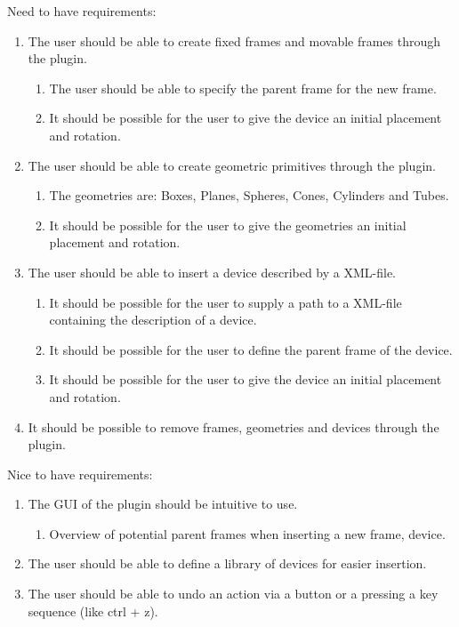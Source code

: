Need to have requirements:
\begin{enumerate}
	\item The user should be able to create fixed frames and movable frames through the plugin.
	\begin{enumerate}
		\item The user should be able to specify the parent frame for the new
		 frame.
		 \item It should be possible for the user to give the device an initial placement and rotation.
	\end{enumerate}
	\item The user should be able to create geometric primitives through the plugin.
	\begin{enumerate}
		\item The geometries are: Boxes, Planes, Spheres, Cones, Cylinders and Tubes.
		\item It should be possible for the user to give the geometries an initial placement and rotation.
	\end{enumerate}
	\item The user should be able to insert a device described by a XML-file.
	\begin{enumerate}
		\item It should be possible for the user to supply a path to a XML-file containing the description of a device.
		\item It should be possible for the user to define the parent frame of the device.
		\item It should be possible for the user to give the device an initial placement and rotation.
	\end{enumerate}
	\item It should be possible to remove frames, geometries and devices through the plugin.
\end{enumerate}

Nice to have requirements:
\begin{enumerate}
	\item The GUI of the plugin should be intuitive to use.
	\begin{enumerate}
		\item Overview of potential parent frames when inserting a new frame, device.
	\end{enumerate}
	\item The user should be able to define a library of devices for easier insertion.
	\item The user should be able to undo an action via a button or a pressing a key sequence (like ctrl + z).
\end{enumerate}
